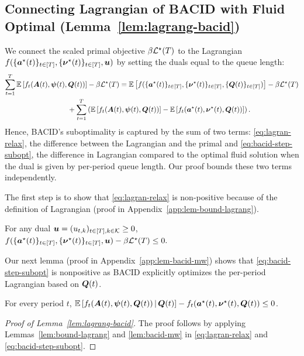 \subsection{Connecting Lagrangian of \textsc{BACID} with Fluid Optimal (Lemma~\ref{lem:lagrang-bacid})}\label{sec:lagrang-bacid} 
We connect the scaled primal objective $\beta \mathcal{L}^\star(T)$ to the Lagrangian $f(\{\boldsymbol{a}^\star(t)\}_{t \in [T]},\{\boldsymbol{\nu}^\star(t)\}_{t \in [T]},\boldsymbol{u})$ by setting the duals equal to the queue length:
\begin{align}
\sum_{t=1}^T \expect{f_t(\bolds{A}(t), \bolds{\psi}(t), \bolds{Q}(t))} - \beta \loss^\star(T) &= \expect{f(\{\bolds{a}^\star(t)\}_{t \in [T]},\{\bolds{\nu}^\star(t)\}_{t \in [T]},\{\bolds{Q}(t)\}_{t \in [T]})} - \beta \loss^\star(T) \label{eq:lagran-relax}\\
&\hspace{-1in}+\sum_{t=1}^T\left(\expect{f_t(\bolds{A}(t), \bolds{\psi}(t), \bolds{Q}(t))} -\expect{f_t(\bolds{a}^\star(t), \bolds{\nu}^\star(t), \bolds{Q}(t))}\right) \label{eq:bacid-step-subopt}.
\end{align}
Hence, \textsc{BACID}'s suboptimality is captured by the sum of two terms:
\eqref{eq:lagran-relax}, the difference between the Lagrangian and the primal and \eqref{eq:bacid-step-subopt}, the difference in Lagrangian compared to the optimal fluid solution when the dual is given by per-period queue length. Our proof bounds these two terms independently. 

The first step is to show that \eqref{eq:lagran-relax} is non-positive because of the definition of Lagrangian (proof in Appendix~\ref{app:lem-bound-lagrang}). 
\begin{lemma}\label{lem:bound-lagrang}
For any dual
$\boldsymbol{u}=(u_{t,k})_{t \in [T], k \in \mathcal{K}} \geq 0$, 
$f(\{\boldsymbol{a}^\star(t)\}_{t\in[T]},\{\boldsymbol{\nu}^\star(t)\}_{t\in[T]},\boldsymbol{u}) - \beta \mathcal{L}^\star(T) \leq 0.$
\end{lemma}
Our next lemma (proof in Appendix~\ref{app:lem-bacid-mw}) shows that  \eqref{eq:bacid-step-subopt} is nonpositive as \textsc{BACID} explicitly optimizes the per-period Lagrangian based on $\boldsymbol{Q}(t)$.
\begin{lemma}\label{lem:bacid-mw}
For every period $t$,
$\mathbb E\left[f_t(\boldsymbol{A}(t),\boldsymbol{\psi}(t),\boldsymbol{Q}(t)) \,\middle\vert\, \boldsymbol{Q}(t)\right] - f_t(\boldsymbol{a}^\star(t),\boldsymbol{\nu}^\star(t),\boldsymbol{Q}(t)) \leq 0$.  
\end{lemma}

\begin{proof}[Proof of Lemma~\ref{lem:lagrang-bacid}]
The proof follows by applying Lemmas~\ref{lem:bound-lagrang} and \ref{lem:bacid-mw} in \eqref{eq:lagran-relax} and \eqref{eq:bacid-step-subopt}.
\end{proof}
